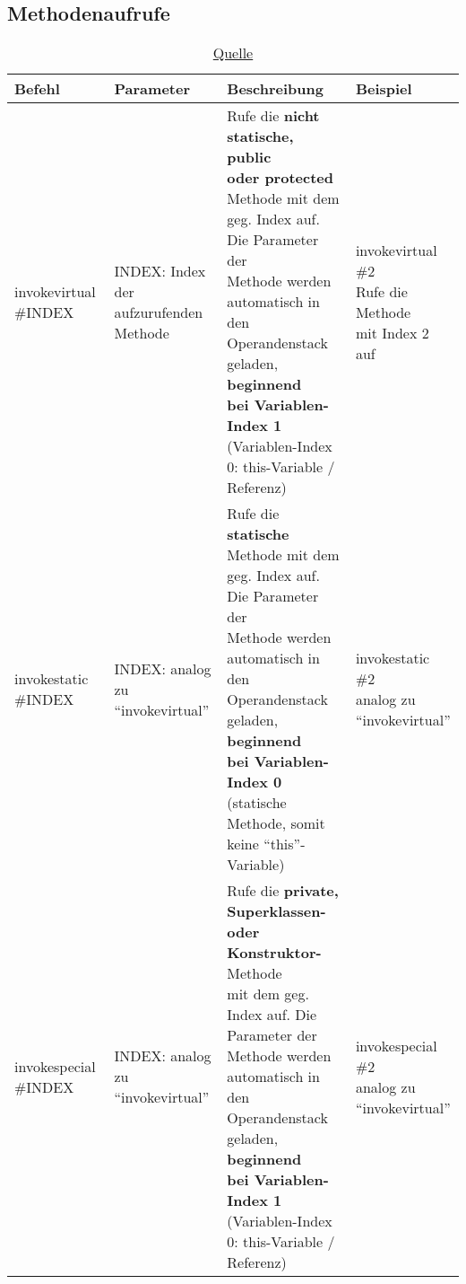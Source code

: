 \subsection{Methodenaufrufe}
\begin{table}[H]
	\centering
	\label{my-label}
	\caption{\href{https://www.javaworld.com/article/2860079/learn-java/dynamic-101.html}{Quelle}}
	\begin{tabular}{l|l|l|l|}
		Befehl & Parameter & Beschreibung & Beispiel \\ \hline
		
		invokevirtual \#INDEX 
		& \multlineTable{INDEX: Index der\\ aufzurufenden Methode} 
		& \multlineTable{Rufe die \textbf{nicht statische, public}\\ \textbf{oder protected} Methode mit dem\\ geg. Index auf. Die Parameter der\\ Methode werden automatisch in den\\ Operandenstack geladen, \textbf{beginnend}\\ \textbf{bei Variablen-Index 1}\\ (Variablen-Index 0: this-Variable / Referenz)} 
		& \multlineTable{invokevirtual \#2\\  Rufe die Methode\\ mit Index 2 auf\\ \slide{73}{419} } \\ \hline
		
		invokestatic \#INDEX 
		& \multlineTable{INDEX:  analog zu\\ \enquote{invokevirtual}} 
		& \multlineTable{Rufe die \textbf{statische} Methode mit dem\\ geg. Index auf. Die Parameter der\\ Methode werden automatisch in den\\ Operandenstack geladen, \textbf{beginnend}\\ \textbf{bei Variablen-Index 0}\\ (statische Methode, somit keine \enquote{this}-Variable)} 
		& \multlineTable{invokestatic \#2\\ analog zu\\ \enquote{invokevirtual}}\\  \hline
		
		invokespecial \#INDEX 
		& \multlineTable{INDEX:  analog zu\\ \enquote{invokevirtual}} 
		& \multlineTable{Rufe die \textbf{private, Superklassen-}\\ \textbf{oder Konstruktor-} Methode\\ mit dem geg. Index auf. Die Parameter der\\ Methode werden automatisch in den\\ Operandenstack geladen, \textbf{beginnend}\\ \textbf{bei Variablen-Index 1}\\ (Variablen-Index 0: this-Variable / Referenz)} 
		& \multlineTable{invokespecial \#2 \\ analog zu\\ \enquote{invokevirtual}} \\ \hline
		

\end{tabular}
\end{table}
